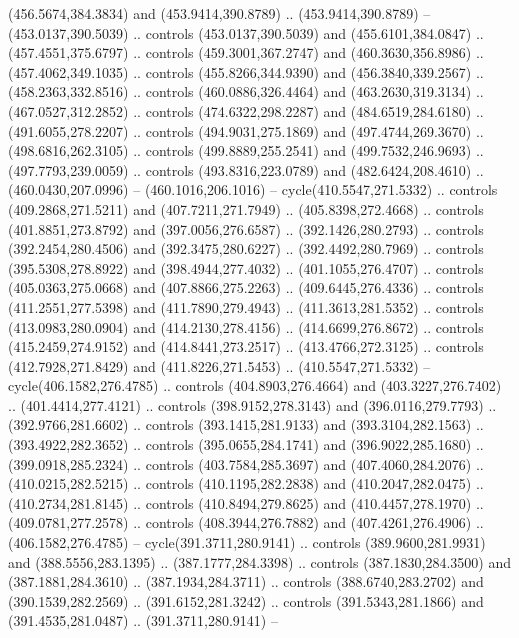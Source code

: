 \begin{scope}[cm={{1.25,0.0,0.0,-1.25,(0.0,743.43331)}}]
    (456.5674,384.3834) and (453.9414,390.8789) .. (453.9414,390.8789) --
    (453.0137,390.5039) .. controls (453.0137,390.5039) and (455.6101,384.0847) ..
    (457.4551,375.6797) .. controls (459.3001,367.2747) and (460.3630,356.8986) ..
    (457.4062,349.1035) .. controls (455.8266,344.9390) and (456.3840,339.2567) ..
    (458.2363,332.8516) .. controls (460.0886,326.4464) and (463.2630,319.3134) ..
    (467.0527,312.2852) .. controls (474.6322,298.2287) and (484.6519,284.6180) ..
    (491.6055,278.2207) .. controls (494.9031,275.1869) and (497.4744,269.3670) ..
    (498.6816,262.3105) .. controls (499.8889,255.2541) and (499.7532,246.9693) ..
    (497.7793,239.0059) .. controls (493.8316,223.0789) and (482.6424,208.4610) ..
    (460.0430,207.0996) -- (460.1016,206.1016) -- cycle(410.5547,271.5332) ..
    controls (409.2868,271.5211) and (407.7211,271.7949) .. (405.8398,272.4668) ..
    controls (401.8851,273.8792) and (397.0056,276.6587) .. (392.1426,280.2793) ..
    controls (392.2454,280.4506) and (392.3475,280.6227) .. (392.4492,280.7969) ..
    controls (395.5308,278.8922) and (398.4944,277.4032) .. (401.1055,276.4707) ..
    controls (405.0363,275.0668) and (407.8866,275.2263) .. (409.6445,276.4336) ..
    controls (411.2551,277.5398) and (411.7890,279.4943) .. (411.3613,281.5352) ..
    controls (413.0983,280.0904) and (414.2130,278.4156) .. (414.6699,276.8672) ..
    controls (415.2459,274.9152) and (414.8441,273.2517) .. (413.4766,272.3125) ..
    controls (412.7928,271.8429) and (411.8226,271.5453) .. (410.5547,271.5332) --
    cycle(406.1582,276.4785) .. controls (404.8903,276.4664) and
    (403.3227,276.7402) .. (401.4414,277.4121) .. controls (398.9152,278.3143) and
    (396.0116,279.7793) .. (392.9766,281.6602) .. controls (393.1415,281.9133) and
    (393.3104,282.1563) .. (393.4922,282.3652) .. controls (395.0655,284.1741) and
    (396.9022,285.1680) .. (399.0918,285.2324) .. controls (403.7584,285.3697) and
    (407.4060,284.2076) .. (410.0215,282.5215) .. controls (410.1195,282.2838) and
    (410.2047,282.0475) .. (410.2734,281.8145) .. controls (410.8494,279.8625) and
    (410.4457,278.1970) .. (409.0781,277.2578) .. controls (408.3944,276.7882) and
    (407.4261,276.4906) .. (406.1582,276.4785) -- cycle(391.3711,280.9141) ..
    controls (389.9600,281.9931) and (388.5556,283.1395) .. (387.1777,284.3398) ..
    controls (387.1830,284.3500) and (387.1881,284.3610) .. (387.1934,284.3711) ..
    controls (388.6740,283.2702) and (390.1539,282.2569) .. (391.6152,281.3242) ..
    controls (391.5343,281.1866) and (391.4535,281.0487) .. (391.3711,280.9141) --

\end{scope}
